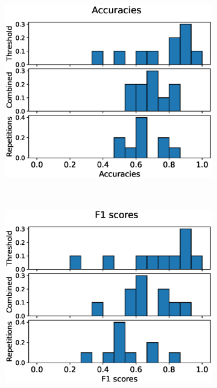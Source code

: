 \begin{figure}
  \centering
  \begin{subfigure}[t]{0.4\textwidth}
    \includegraphics[width=\textwidth]{files/figs/res/pelvis/acc.eps}
    \caption{}
    \label{fig:pelvis-acc}
  \end{subfigure}
  ~
  \begin{subfigure}[t]{0.4\textwidth}
    \includegraphics[width=\textwidth]{files/figs/res/pelvis/f1.eps}
    \caption{}
    \label{fig:pelvis-f1}
  \end{subfigure}


\end{figure}
